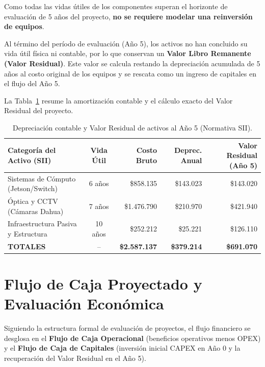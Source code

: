 Como todas las vidas útiles de los componentes superan el horizonte de evaluación de 5 años del proyecto, \textbf{no se requiere modelar una reinversión de equipos}.

Al término del período de evaluación (Año 5), los activos no han concluido su vida útil física ni contable, por lo que conservan un \textbf{Valor Libro Remanente (Valor Residual)}. Este valor se calcula restando la depreciación acumulada de 5 años al costo original de los equipos y se rescata como un ingreso de capitales en el flujo del Año 5.

La Tabla~\ref{tab:depreciacion} resume la amortización contable y el cálculo exacto del Valor Residual del proyecto.

\begin{table}[H]
    \centering
    \footnotesize
    \setlength{\tabcolsep}{3.5pt}
    \caption{Depreciación contable y Valor Residual de activos al Año 5 (Normativa SII).}
    \begin{tabular}{|p{4.2cm}|c|r|r|r|}
        \hline
        \textbf{Categoría del Activo (SII)} & \textbf{Vida Útil} & \textbf{Costo Bruto} & \textbf{Deprec. Anual} & \textbf{Valor Residual (Año 5)} \\ \hline
        Sistemas de Cómputo (Jetson/Switch) & 6 años & \$858.135 & \$143.023 & \$143.020 \\ \hline
        Óptica y CCTV (Cámaras Dahua) & 7 años & \$1.476.790 & \$210.970 & \$421.940 \\ \hline
        Infraestructura Pasiva y Estructura & 10 años & \$252.212 & \$25.221 & \$126.110 \\ \hline
        \hline
        \textbf{TOTALES} & -- & \textbf{\$2.587.137} & \textbf{\$379.214} & \textbf{\$691.070} \\ \hline
    \end{tabular}
    \label{tab:depreciacion}
\end{table}

\section{Flujo de Caja Proyectado y Evaluación Económica}
\label{sec:flujo_caja}

Siguiendo la estructura formal de evaluación de proyectos, el flujo financiero se desglosa en el \textbf{Flujo de Caja Operacional} (beneficios operativos menos OPEX) y el \textbf{Flujo de Caja de Capitales} (inversión inicial CAPEX en Año 0 y la recuperación del Valor Residual en el Año 5). 

